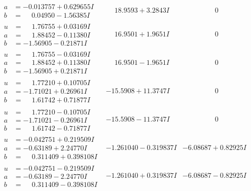 \documentclass[1p]{elsarticle_modified}
\theoremstyle{definition}
\begin{document}
$$\begin{array}{c|c|c}
\begin{aligned}
a &= -0.013757 + 0.629655 I \\
b &= \phantom{-}0.04950 - 1.56385 I\end{aligned}
 & \phantom{-}18.9593 + 3.2843 I & \phantom{-0.000000 } 0 \\ \hline\begin{aligned}
u &= \phantom{-}1.76755 + 0.03169 I \\
a &= \phantom{-}1.88452 - 0.11380 I \\
b &= -1.56905 - 0.21871 I\end{aligned}
 & \phantom{-}16.9501 + 1.9651 I & \phantom{-0.000000 } 0 \\ \hline\begin{aligned}
u &= \phantom{-}1.76755 - 0.03169 I \\
a &= \phantom{-}1.88452 + 0.11380 I \\
b &= -1.56905 + 0.21871 I\end{aligned}
 & \phantom{-}16.9501 - 1.9651 I & \phantom{-0.000000 } 0 \\ \hline\begin{aligned}
u &= \phantom{-}1.77210 + 0.10705 I \\
a &= -1.71021 + 0.26961 I \\
b &= \phantom{-}1.61742 + 0.71877 I\end{aligned}
 & -15.5908 + 11.3747 I & \phantom{-0.000000 } 0 \\ \hline\begin{aligned}
u &= \phantom{-}1.77210 - 0.10705 I \\
a &= -1.71021 - 0.26961 I \\
b &= \phantom{-}1.61742 - 0.71877 I\end{aligned}
 & -15.5908 - 11.3747 I & \phantom{-0.000000 } 0 \\ \hline\begin{aligned}
u &= -0.042751 + 0.219509 I \\
a &= -0.63189 + 2.24770 I \\
b &= \phantom{-}0.311409 + 0.398108 I\end{aligned}
 & -1.261040 - 0.319837 I & -6.08687 + 0.82925 I \\ \hline\begin{aligned}
u &= -0.042751 - 0.219509 I \\
a &= -0.63189 - 2.24770 I \\
b &= \phantom{-}0.311409 - 0.398108 I\end{aligned}
 & -1.261040 + 0.319837 I & -6.08687 - 0.82925 I \\ \hline\begin{aligned}

\end{aligned}
\end{array}$$
\end{document}
